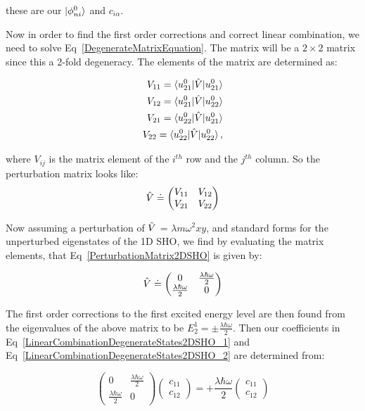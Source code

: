 \noindent these are our $\ket{\phi^0_{ni}}$ and $c_{i\alpha}$.

\noindent Now in order to find the first order corrections and correct linear combination, we need to solve Eq~\ref{DegenerateMatrixEquation}. The matrix will be a $2 \times 2$ matrix since this a 2-fold degeneracy. The elements of the matrix are determined as:

\begin{eqnarray}
    V_{11} = \braket{u^0_{21} | \Hat{V} | u^0_{21}}  \\
    V_{12} = \braket{u^0_{21} | \Hat{V} | u^0_{22}} \\
    V_{21} = \braket{u^0_{22} | \Hat{V} | u^0_{21}} \\
    V_{22} = \braket{u^0_{22} | \Hat{V} | u^0_{22}},
    \label{MatrixElements2DSHO}
\end{eqnarray}

\noindent where $V_{ij}$ is the matrix element of the $i^{th}$ row and the $j^{th}$ column. So the perturbation matrix looks like:
\begin{equation}
    \Hat{V} \doteq \begin{pmatrix} V_{11} & V_{12} \\ V_{21} & V_{22} \end{pmatrix}
    \label{PerturbationMatrix2DSHO}
\end{equation}

\noindent Now assuming a perturbation of $\Hat{V}$ = $\lambda m  \omega^2 xy$, and standard forms for the unperturbed eigenstates of the 1D SHO, we find by evaluating the matrix elements, that Eq~\ref{PerturbationMatrix2DSHO} is given by:

\begin{equation}
    \Hat{V} \doteq \begin{pmatrix} 0 & \frac{\lambda \hbar \omega}{2} \\ \frac{\lambda \hbar \omega}{2} & 0 \end{pmatrix}
\end{equation}

\noindent The first order corrections to the first excited energy level are then found from the eigenvalues of the above matrix to be $E^1_2 = \pm \frac{\lambda \hbar \omega}{2}$. Then our coefficients in Eq~\ref{LinearCombinationDegenerateStates2DSHO_1} and Eq~\ref{LinearCombinationDegenerateStates2DSHO_2} are determined from:

\begin{equation}
    \begin{pmatrix} 0 & \frac{\lambda \hbar \omega}{2} \\ \frac{\lambda \hbar \omega}{2} & 0 \end{pmatrix} \begin{pmatrix} c_{11} \\ c_{12} \end{pmatrix} = + \frac{\lambda \hbar \omega}{2} \begin{pmatrix} c_{11} \\ c_{12} \end{pmatrix}
\end{equation}

